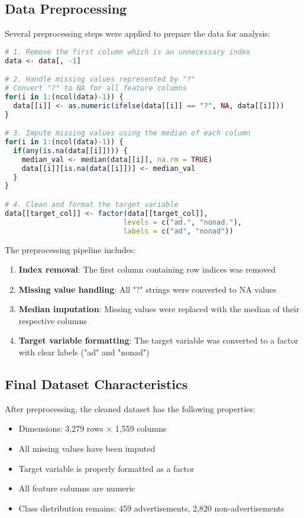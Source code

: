 \subsection{Data Preprocessing}
Several preprocessing steps were applied to prepare the data for analysis:

\begin{lstlisting}[language=R]
# 1. Remove the first column which is an unnecessary index
data <- data[, -1]

# 2. Handle missing values represented by "?"
# Convert "?" to NA for all feature columns
for(i in 1:(ncol(data)-1)) {
  data[[i]] <- as.numeric(ifelse(data[[i]] == "?", NA, data[[i]]))
}

# 3. Impute missing values using the median of each column
for(i in 1:(ncol(data)-1)) {
  if(any(is.na(data[[i]]))) {
    median_val <- median(data[[i]], na.rm = TRUE)
    data[[i]][is.na(data[[i]])] <- median_val
  }
}

# 4. Clean and format the target variable
data[[target_col]] <- factor(data[[target_col]], 
                            levels = c("ad.", "nonad."), 
                            labels = c("ad", "nonad"))
\end{lstlisting}

The preprocessing pipeline includes:
\begin{enumerate}
    \item \textbf{Index removal}: The first column containing row indices was removed
    \item \textbf{Missing value handling}: All "?" strings were converted to NA values
    \item \textbf{Median imputation}: Missing values were replaced with the median of their respective columns
    \item \textbf{Target variable formatting}: The target variable was converted to a factor with clear labels ("ad" and "nonad")
\end{enumerate}

\subsection{Final Dataset Characteristics}
After preprocessing, the cleaned dataset has the following properties:
\begin{itemize}
    \item Dimensions: 3,279 rows × 1,559 columns
    \item All missing values have been imputed
    \item Target variable is properly formatted as a factor
    \item All feature columns are numeric
    \item Class distribution remains: 459 advertisements, 2,820 non-advertisements
\end{itemize}

